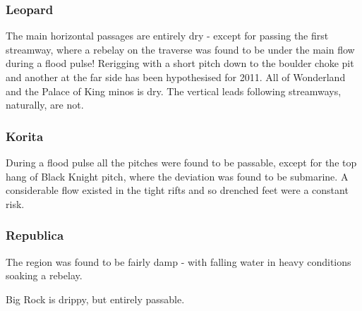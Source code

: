 \documentclass[english,a4]{article}
\begin{document}
\subsubsection{Leopard}

The main horizontal passages are entirely dry - except for passing
the first streamway, where a rebelay on the traverse was found to
be under the main flow during a flood pulse! Rerigging with a short
pitch down to the boulder choke pit and another at the far side has
been hypothesised for 2011. All of Wonderland and the Palace of King
minos is dry. The vertical leads following streamways, naturally,
are not.


\subsubsection{Korita}

During a flood pulse all the pitches were found to be passable, except
for the top hang of Black Knight pitch, where the deviation was found
to be submarine. A considerable flow existed in the tight rifts and
so drenched feet were a constant risk.


\subsubsection{Republica}

The region was found to be fairly damp - with falling water in heavy conditions
soaking a rebelay. 

Big Rock is drippy, but entirely passable.
\end{document}
